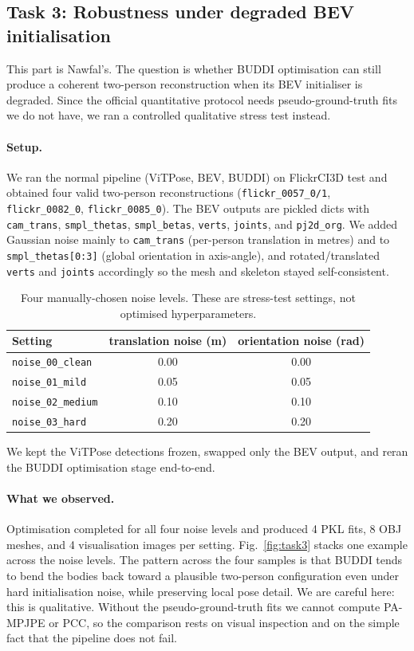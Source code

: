 \documentclass[10pt]{article}
\begin{document}
\subsection{Task 3: Robustness under degraded BEV initialisation}
\label{sec:task3}

This part is Nawfal's. The question is whether BUDDI optimisation can still produce a coherent two-person reconstruction when its BEV initialiser is degraded. Since the official quantitative protocol needs pseudo-ground-truth fits we do not have, we ran a controlled qualitative stress test instead.

\paragraph{Setup.}
We ran the normal pipeline (ViTPose, BEV, BUDDI) on FlickrCI3D test and obtained four valid two-person reconstructions (\texttt{flickr\_0057\_0/1}, \texttt{flickr\_0082\_0}, \texttt{flickr\_0085\_0}). The BEV outputs are pickled dicts with \texttt{cam\_trans}, \texttt{smpl\_thetas}, \texttt{smpl\_betas}, \texttt{verts}, \texttt{joints}, and \texttt{pj2d\_org}. We added Gaussian noise mainly to \texttt{cam\_trans} (per-person translation in metres) and to \texttt{smpl\_thetas[0:3]} (global orientation in axis-angle), and rotated/translated \texttt{verts} and \texttt{joints} accordingly so the mesh and skeleton stayed self-consistent.

\begin{table}[H]
\centering
\small
\begin{tabular}{lcc}
\toprule
Setting & translation noise (m) & orientation noise (rad) \\
\midrule
\texttt{noise\_00\_clean}  & 0.00 & 0.00 \\
\texttt{noise\_01\_mild}   & 0.05 & 0.05 \\
\texttt{noise\_02\_medium} & 0.10 & 0.10 \\
\texttt{noise\_03\_hard}   & 0.20 & 0.20 \\
\bottomrule
\end{tabular}
\caption{Four manually-chosen noise levels. These are stress-test settings, not optimised hyperparameters.}
\label{tab:noise_levels}
\end{table}

We kept the ViTPose detections frozen, swapped only the BEV output, and reran the BUDDI optimisation stage end-to-end.

\paragraph{What we observed.}
Optimisation completed for all four noise levels and produced 4 PKL fits, 8 OBJ meshes, and 4 visualisation images per setting. Fig.~\ref{fig:task3} stacks one example across the noise levels. The pattern across the four samples is that BUDDI tends to bend the bodies back toward a plausible two-person configuration even under hard initialisation noise, while preserving local pose detail. We are careful here: this is qualitative. Without the pseudo-ground-truth fits we cannot compute PA-MPJPE or PCC, so the comparison rests on visual inspection and on the simple fact that the pipeline does not fail.
\end{document}
